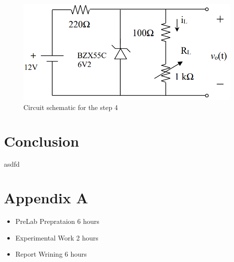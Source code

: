 \documentclass[letterpaper,12pt]{article}
\begin{document}
\begin{figure}[H]
    \centering
    \includegraphics[width=1\textwidth]{4_1.png}
    \caption{Circuit schematic for the step 4}
\end{figure} 
    
    
\section{Conclusion}
asdfd
\section*{Appendix A}
\begin{itemize}
    \item PreLab Preprataion 6 hours
    \item Experimental Work 2  hours
    \item Report Wrining 6 hours
\end{itemize}
\end{document}
